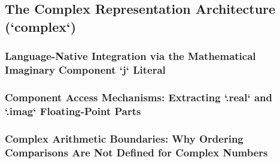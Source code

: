 \subsection{The Complex Representation Architecture (`complex`)}
\subsubsection{Language-Native Integration via the Mathematical Imaginary Component `j` Literal}
\subsubsection{Component Access Mechanisms: Extracting `.real` and `.imag` Floating-Point Parts}
\subsubsection{Complex Arithmetic Boundaries: Why Ordering Comparisons Are Not Defined for Complex Numbers}
